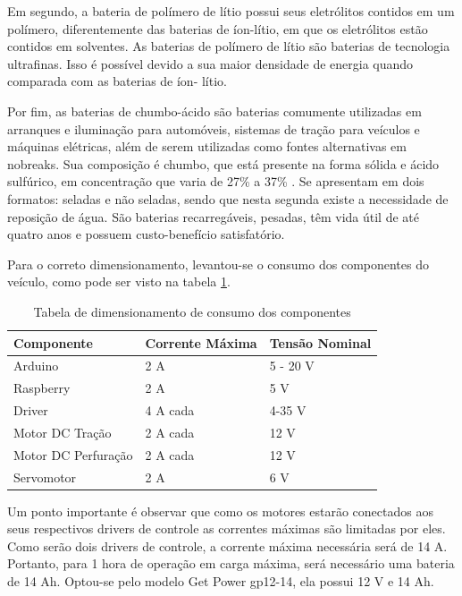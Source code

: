      Em segundo, a bateria de polímero de lítio possui seus eletrólitos contidos em um polímero, diferentemente das baterias 
     de íon-lítio, em que os eletrólitos estão contidos em solventes. As baterias de polímero de lítio são baterias de tecnologia 
     ultrafinas. Isso é possível devido a sua maior densidade de energia quando comparada com as baterias de íon- lítio.
     
     Por fim, as baterias de chumbo-ácido são baterias comumente utilizadas em arranques e iluminação para automóveis, 
     sistemas de tração para veículos e máquinas elétricas, além de serem utilizadas como fontes alternativas em nobreaks. 
     Sua composição é chumbo, que está presente na forma sólida e ácido sulfúrico, em concentração que varia de 27\% a 37\% 
     \cite{pulsada2005juliano}. Se apresentam em dois formatos: seladas e não seladas, sendo que nesta segunda existe a necessidade de 
     reposição de água. São baterias recarregáveis, pesadas, têm vida útil de até quatro anos e possuem custo-benefício satisfatório.
  
     Para o correto dimensionamento, levantou-se o consumo dos componentes do veículo, como pode ser visto na tabela \ref{tabeladimensionamento}.
  
      \begin{table}[!htbp]
      \centering
      \caption{Tabela de dimensionamento de consumo dos componentes}
      \label{tabeladimensionamento}
      \begin{tabular}{|p{4cm}|p{4cm}|p{4cm}|}
      \hline
      Componente          & Corrente Máxima & Tensão Nominal \\\hline
      Arduino             & 2 A             & 5 - 20 V       \\\hline
      Raspberry           & 2 A             & 5 V            \\\hline
      Driver              & 4 A cada        & 4-35 V         \\\hline
      Motor DC Tração     & 2 A cada        & 12 V           \\\hline
      Motor DC Perfuração & 2 A cada        & 12 V           \\\hline
      Servomotor          & 2 A             & 6 V            \\\hline
      \end{tabular}
      \end{table}

      Um ponto importante é observar que como os motores estarão conectados aos seus respectivos drivers de controle as 
      correntes máximas são limitadas por eles. Como serão dois drivers de controle, a corrente máxima necessária será de 
      14 A. Portanto, para 1 hora de operação em carga máxima, será necessário uma bateria de 14 Ah. Optou-se pelo modelo Get 
      Power gp12-14, ela possui 12 V e 14 Ah.
      
